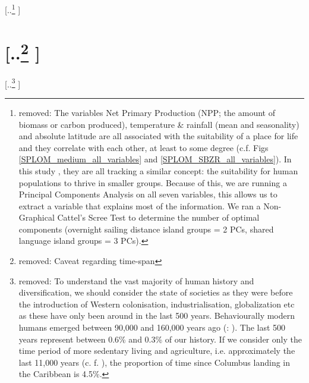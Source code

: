 \documentclass[unnumsec,webpdf,modern,medium]{oup-authoring-template}
\providecommand{\DIFdeltex}[1]{{\protect\color{red} [..\footnote{removed: #1} ]}} %
\providecommand{\DIFdel}[1]{\texorpdfstring{\DIFdeltex{#1}}{}} %
\begin{document}
\DIFdel{The variables Net Primary Production (NPP; the amount of biomass or carbon produced), temperature \& rainfall (mean and seasonality) and absolute latitude are all associated with the suitability of a place for life and they correlate with each other, at least to some degree (c.f. Figs \ref{SPLOM_medium_all_variables} and \ref{SPLOM_SBZR_all_variables}). In this study , they are all tracking a similar concept: the suitability for human populations to thrive in smaller groups. Because of this, we are running a Principal Components Analysis on all seven variables, this allows us to extract a variable that explains most of the information. We ran a Non-Graphical Cattel's Scree Test \citep{cattell1966scree, R-nFactors} to determine the number of optimal components (overnight sailing distance island groups = 2 PCs, shared language island groups = 3 PCs).
}%

\section{\DIFdel{Caveat regarding time-span}}
\addtocounter{section}{-1}%

\DIFdel{To understand the vast majority of human history and diversification, we should consider the state of societies as they were before the introduction of Western colonisation, industrialisation, globalization etc as these have only been around in the last 500 years. Behaviourally modern humans emerged between 90,000 and 160,000 years ago (\citet{powell2009late}: \cite{marean2007early}). The last 500 years represent between 0.6\% and 0.3\% of our history. If we consider only the time period of more sedentary living and agriculture, i.e. approximately the last 11,000 years (c. f. \citet{kislev2006early}), the proportion of time since Columbus landing in the Caribbean is 4.5\%.
}%
\end{document}
